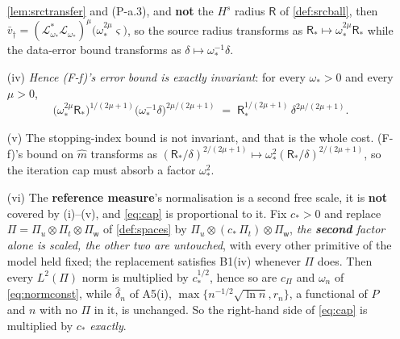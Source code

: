 \begin{lemma}
\begin{enumerate}
\cref{lem:srctransfer} and (P-a.3), and \textbf{not} the $H^{s}$ radius $\mathsf R$ of
\cref{def:srcball}, then
$\bar v_\dagger=(\mathcal L^{\ast}_{\omega_\ast}\mathcal L_{\omega_\ast})^{\mu}\big(\omega_\ast^{2\mu}\varsigma\big)$,
so the source radius transforms as $\mathsf R_\ast\mapsto\omega_\ast^{2\mu}\mathsf R_\ast$ while the
data-error bound transforms as $\delta\mapsto\omega_\ast^{-1}\delta$.
\item[(iv)] \emph{Hence \textup{(F-f)}'s error bound is exactly invariant}: for every $\omega_\ast>0$ and
every $\mu>0$,
\begin{equation}\label{eq:scaleinv}
\big(\omega_\ast^{2\mu}\mathsf R_\ast\big)^{1/(2\mu+1)}\big(\omega_\ast^{-1}\delta\big)^{2\mu/(2\mu+1)}
\;=\;\mathsf R_\ast^{1/(2\mu+1)}\,\delta^{2\mu/(2\mu+1)} .
\end{equation}
\item[(v)] The stopping-index bound is not invariant, and that is the whole cost.
\textup{(F-f)}'s bound on $\hat m$ transforms as
$(\mathsf R_\ast/\delta)^{2/(2\mu+1)}\mapsto\omega_\ast^{2}(\mathsf R_\ast/\delta)^{2/(2\mu+1)}$, so the
iteration cap must absorb a factor $\omega_\ast^{2}$.
\item[(vi)] The \textbf{reference measure}'s normalisation is a second free scale, it is
\textbf{not} covered by \textup{(i)}--\textup{(v)}, and \eqref{eq:cap} is proportional to it. Fix
$c_\ast>0$ and replace $\Pi=\Pi_u\otimes\Pi_t\otimes\Pi_{\mathsf w}$ of \cref{def:spaces} by
$\Pi_u\otimes(c_\ast\,\Pi_t)\otimes\Pi_{\mathsf w}$, \emph{the \textbf{second} factor alone is
scaled, the other two are untouched}, with every other primitive of the model
held fixed;
the replacement satisfies B1(iv) whenever $\Pi$ does. Then every $L^{2}(\Pi)$ norm is multiplied by
$c_\ast^{1/2}$, hence so are $c_\Pi$ and $\omega_n$ of \eqref{eq:normconst}, while $\hat\delta_n$ of
A5(i), 
$\max\{n^{-1/2}\sqrt{\ln n},r_n\}$, a functional of $P$ and $n$ with no $\Pi$ in it, is unchanged.
So the right-hand side of \eqref{eq:cap} is multiplied by $c_\ast$ \emph{exactly}.

\end{enumerate}
\end{lemma}
